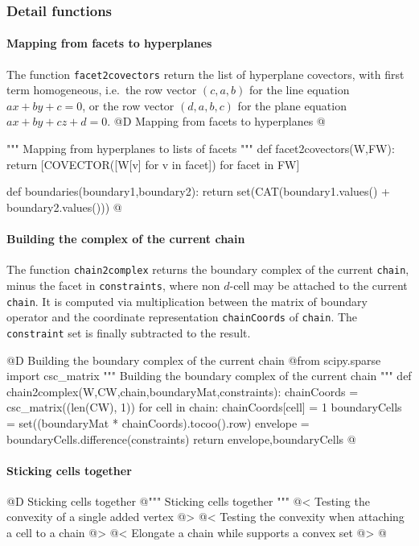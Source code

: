 \documentclass[11pt,oneside]{article}	%
\begin{document}
\subsubsection{Detail functions}




\paragraph{Mapping from facets to hyperplanes}
The function \texttt{facet2covectors} return the list of hyperplane covectors, with first term homogeneous, i.e.~the row vector $(c,a,b)$ for the line equation $ax+by+c=0$, or the row vector $(d,a,b,c)$ for the plane equation $ax+by+cz+d=0$.
@D Mapping from facets to hyperplanes
@{""" Mapping from hyperplanes to lists of facets """
def facet2covectors(W,FW):
	return [COVECTOR([W[v] for v in facet]) for facet in FW]

def boundaries(boundary1,boundary2):
	return set(CAT(boundary1.values() + boundary2.values()))
@}

\paragraph{Building the complex of the current chain}
The function \texttt{chain2complex} returns the boundary complex of the current \texttt{chain}, minus the facet in \texttt{constraints}, where non $d$-cell may be attached to the current \texttt{chain}.
It is computed via multiplication between the matrix of boundary operator and the coordinate representation \texttt{chainCoords} of \texttt{chain}. The \texttt{constraint} set is finally subtracted to the result.  

@D Building the boundary complex of the current chain
@{from scipy.sparse import csc_matrix
""" Building the boundary complex of the current chain """
def chain2complex(W,CW,chain,boundaryMat,constraints):
	chainCoords = csc_matrix((len(CW), 1))
	for cell in chain: chainCoords[cell] = 1
	boundaryCells = set((boundaryMat * chainCoords).tocoo().row)
	envelope = boundaryCells.difference(constraints)
	return envelope,boundaryCells
@}

\paragraph{Sticking cells together}
@D Sticking cells together
@{""" Sticking cells together """
@< Testing the convexity of a single added vertex @>
@< Testing the convexity when attaching a cell to a chain @>
@< Elongate a chain while supports a convex set @>
@}
\end{document}
